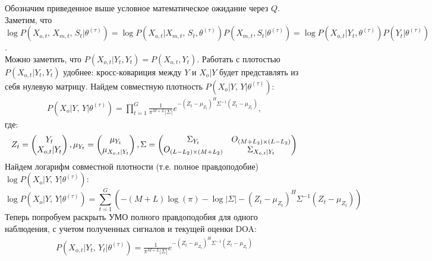\documentclass[11pt]{article}
\begin{document}
Обозначим приведенное выше условное математическое ожидание через $Q$. 
Заметим, что \\ $\log P(X_{o,t}, \, X_{m,t}, \, S_t|\theta^{(\tau)}) = \log P(X_{o,t}|X_{m,t}, \, S_t,\theta^{(\tau)})P(X_{m,t}, S_t|\theta^{(\tau)}) = \log P(X_{o,t}|Y_t,\theta^{(\tau)})P(Y_t|\theta^{(\tau)})$.\\
Можно заметить, что $P(X_{o,t}|Y_t, Y_t) = P(X_{o,t}, Y_t)$. Работать с плотостью $P(X_{o,t}|Y_t, Y_t)$ удобнее: кросс-ковариция между $Y$ и $X_o|Y$ будет представлять из себя нулевую матрицу.
Найдем совместную плотность $P(X_o|Y, \, Y|\theta^{(\tau)})$:
\begin{gather}
P(X_o|Y, \, Y|\theta^{(\tau)}) = \prod_{t=1}^G \frac{1}{\pi^{M+L}|\Sigma|}e^{-(Z_t-\mu_{Z_t})^H\Sigma^{-1}(Z_t-\mu_{Z_t})},
\end{gather}
где:
\begin{equation*}
Z_t = \begin{pmatrix}
Y_t\\
X_{o,t}|Y_t
\end{pmatrix},
\mu_{Y_t} = \begin{pmatrix}
\mu_{Y_t}\\
\mu_{X_{o,t}|Y_t}
\end{pmatrix}\\,
\Sigma = 
\begin{pmatrix}
\Sigma_{Y_t}&O_{(M+L_2)\times (L-L_2)}\\
O_{(L-L_2)\times (M+L_2)}&\Sigma_{X_{o,t}|Y_t}
\end{pmatrix}
\end{equation*}
Найдем логарифм совместной плотности (т.е. полное правдоподобие) $\log P(X_o|Y, \, Y|\theta^{(\tau)})$:
\begin{equation*}
\log P(X_o|Y, \, Y|\theta^{(\tau)}) = \sum_{t=1}^G \left(-(M+L)\log(\pi)-\log|\Sigma|-(Z_t-\mu_{Z_t})^H\Sigma^{-1}(Z_t-\mu_{Z_t})\right)
\end{equation*}
Теперь попробуем раскрыть УМО полного правдоподобия для одного наблюдения, с учетом полученных сигналов и текущей оценки DOA:
\begin{gather}
P(X_{o,t}|Y_t, \, Y_t|\theta^{(\tau)}) = \frac{1}{\pi^{M+L}|\Sigma|}e^{-(Z_t-\mu_{Z_t})^H\Sigma^{-1}(Z_t-\mu_{Z_t})}
\end{gather}
\end{document}
